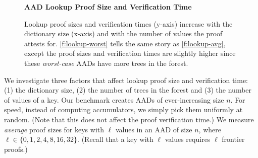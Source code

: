 \begin{figure}[t]
    \centering
    \textbf{AAD Lookup Proof Size and Verification Time}\par\medskip
    \caption{
        Lookup proof sizes and verification times (y-axis) increase with the dictionary size (x-axis) and with the number of values the proof attests for.
        \cref{f:lookup-worst} tells the same story as \cref{f:lookup-avg}, except the proof sizes and verification times are slightly higher since these \textit{worst-case} AADs have more trees in the forest.
    }
\end{figure}

We investigate three factors that affect lookup proof size and verification time: (1) the dictionary size, (2) the number of trees in the forest and (3) the number of values of a key.
Our benchmark creates AADs of ever-increasing size $n$.
For speed, instead of computing accumulators, we simply pick them uniformly at random.
(Note that this does not affect the proof verification time.)
We measure \textit{average} proof sizes for keys with $\ell$ values in an AAD of size $n$, where $\ell \in \{0, 1, 2, 4, 8, 16, 32\}$.
(Recall that a key with $\ell$ values requires $\ell$ frontier proofs.)

